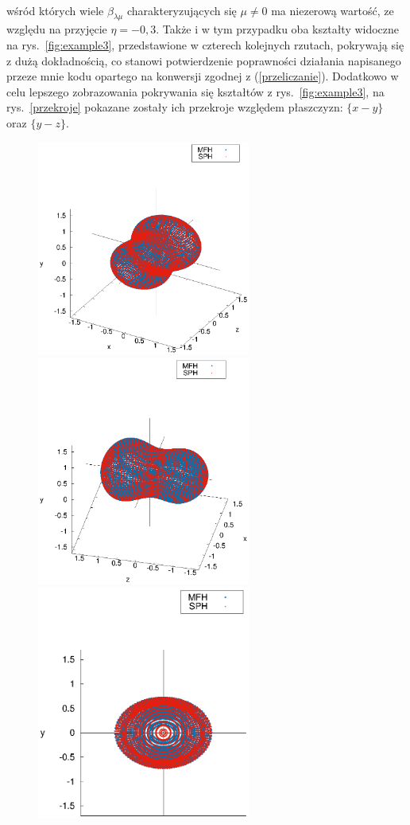 \documentclass[a4paper,polish]{article}
\numberwithin{equation}{section}
\begin{document}
\\
wśród których wiele $\beta_{\lambda \mu}$ charakteryzujących się $\mu \neq 0$ ma niezerową wartość, ze względu na przyjęcie $\eta=-0,3$. Także i w tym przypadku oba kształty widoczne na rys.~\ref{fig:example3}, przedstawione w czterech kolejnych rzutach, pokrywają się z dużą dokładnością, co stanowi potwierdzenie poprawności działania napisanego przeze mnie kodu opartego na konwersji zgodnej z (\ref{przeliczanie}). Dodatkowo w celu lepszego zobrazowania pokrywania się kształtów z rys.~\ref{fig:example3}, na rys.~\ref{przekroje} pokazane zostały ich przekroje względem płaszczyzn: $\{x-y\}$ oraz $\{y-z\}$.

\clearpage
\vspace*{\fill}
\begin{figure}[ht!]
    \centering
    \includegraphics[width=7cm]{rys1.eps}    
    \includegraphics[width=7cm]{rys2.eps}\\    
    \vspace{1.5cm}    
    \includegraphics[width=7cm]{rys3.eps}

\end{figure}
\end{document}
